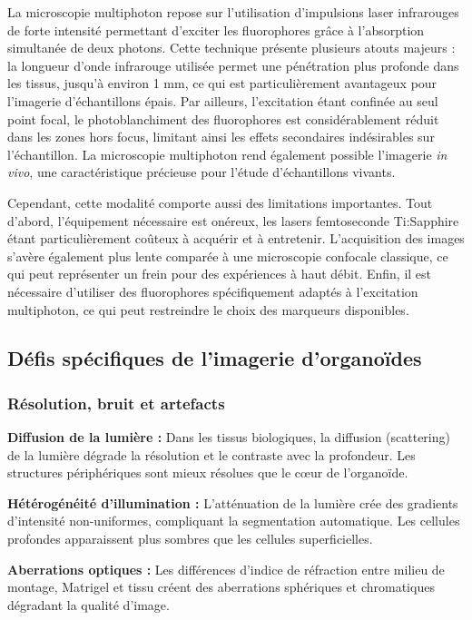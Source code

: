La microscopie multiphoton repose sur l’utilisation d’impulsions laser infrarouges de forte intensité permettant d’exciter les fluorophores grâce à l’absorption simultanée de deux photons. Cette technique présente plusieurs atouts majeurs : la longueur d’onde infrarouge utilisée permet une pénétration plus profonde dans les tissus, jusqu’à environ 1 mm, ce qui est particulièrement avantageux pour l’imagerie d’échantillons épais. Par ailleurs, l’excitation étant confinée au seul point focal, le photoblanchiment des fluorophores est considérablement réduit dans les zones hors focus, limitant ainsi les effets secondaires indésirables sur l’échantillon. La microscopie multiphoton rend également possible l’imagerie \textit{in vivo}, une caractéristique précieuse pour l’étude d’échantillons vivants.

Cependant, cette modalité comporte aussi des limitations importantes. Tout d’abord, l’équipement nécessaire est onéreux, les lasers femtoseconde Ti:Sapphire étant particulièrement coûteux à acquérir et à entretenir. L’acquisition des images s’avère également plus lente comparée à une microscopie confocale classique, ce qui peut représenter un frein pour des expériences à haut débit. Enfin, il est nécessaire d’utiliser des fluorophores spécifiquement adaptés à l’excitation multiphoton, ce qui peut restreindre le choix des marqueurs disponibles.

\subsection{Défis spécifiques de l'imagerie d'organoïdes}

\subsubsection{Résolution, bruit et artefacts}

\textbf{Diffusion de la lumière :}
Dans les tissus biologiques, la diffusion (scattering) de la lumière dégrade la résolution et le contraste avec la profondeur. Les structures périphériques sont mieux résolues que le cœur de l'organoïde.

\textbf{Hétérogénéité d'illumination :}
L'atténuation de la lumière crée des gradients d'intensité non-uniformes, compliquant la segmentation automatique. Les cellules profondes apparaissent plus sombres que les cellules superficielles.

\textbf{Aberrations optiques :}
Les différences d'indice de réfraction entre milieu de montage, Matrigel et tissu créent des aberrations sphériques et chromatiques dégradant la qualité d'image.

